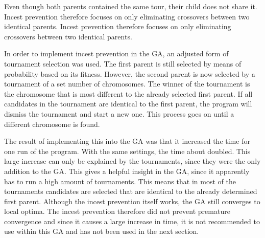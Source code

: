 \noindent Even though both parents contained the same tour, their child does not share it. Incest prevention therefore focuses on only eliminating crossovers between two identical parents. Incest prevention therefore focuses on only eliminating crossovers between two identical parents.

\par
In order to implement incest prevention in the GA, an adjusted form of tournament selection was used. The first parent is still selected by means of probability based on its fitness. However, the second parent is now selected by a tournament of a set number of chromosomes. The winner of the tournament is the chromosome that is most different to the already selected first parent. If all candidates in the tournament are identical to the first parent, the program will dismiss the tournament and start a new one. This process goes on until a different chromosome is found. 

\par
The result of implementing this into the GA was that it increased the time for one run of the program. With the same settings, the time about doubled. This large increase can only be explained by the tournaments, since they were the only addition to the GA. This gives a helpful insight in the GA, since it apparently has to run a high amount of tournaments. This means that in most of the tournaments candidates are selected that are identical to the already determined first parent. Although the incest prevention itself works, the GA still converges to local optima. The incest prevention therefore did not prevent premature convergence and since it causes a large increase in time, it is not recommended to use within this GA and has not been used in the next section. 

